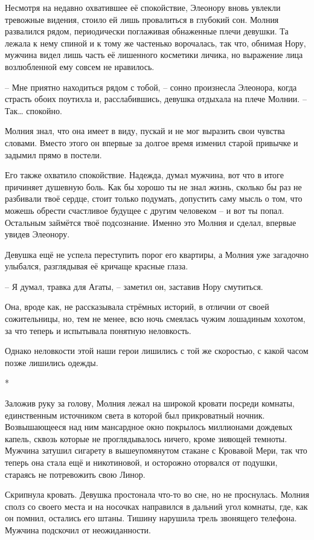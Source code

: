 \documentclass[
  a5paperpaper,
  DIV=11,
  numbers=noendperiod]{scrreprt}
\begin{document}

Несмотря на недавно охватившее её спокойствие, Элеонору вновь увлекли
тревожные видения, стоило ей лишь провалиться в глубокий сон. Молния
развалился рядом, периодически поглаживая обнаженные плечи девушки. Та
лежала к нему спиной и к тому же частенько ворочалась, так что, обнимая
Нору, мужчина видел лишь часть её лишенного косметики личика, но
выражение лица возлюбленной ему совсем не нравилось.

-- Мне приятно находиться рядом с тобой, -- сонно произнесла Элеонора,
когда страсть обоих поутихла и, расслабившись, девушка отдыхала на плече
Молнии. -- Так\ldots{} спокойно.

Молния знал, что она имеет в виду, пускай и не мог выразить свои чувства
словами. Вместо этого он впервые за долгое время изменил старой привычке
и задымил прямо в постели.

Его также охватило спокойствие. Надежда, думал мужчина, вот что в итоге
причиняет душевную боль. Как бы хорошо ты не знал жизнь, сколько бы раз
не разбивали твоё сердце, стоит только подумать, допустить саму мысль о
том, что можешь обрести счастливое будущее с другим человеком -- и вот
ты попал. Остальным займётся твоё подсознание. Именно это Молния и
сделал, впервые увидев Элеонору.

Девушка ещё не успела переступить порог его квартиры, а Молния уже
загадочно улыбался, разглядывая её кричаще красные глаза.

-- Я думал, травка для Агаты, -- заметил он, заставив Нору смутиться.

Она, вроде как, не рассказывала стрёмных историй, в отличии от своей
сожительницы, но, тем не менее, всю ночь смеялась чужим лошадиным
хохотом, за что теперь и испытывала понятную неловкость.

Однако неловкости этой наши герои лишились с той же скоростью, с какой
часом позже лишились одежды.

*

Заложив руку за голову, Молния лежал на широкой кровати посреди комнаты,
единственным источником света в которой был прикроватный ночник.
Возвышающееся над ним мансардное окно покрылось миллионами дождевых
капель, сквозь которые не проглядывалось ничего, кроме зияющей темноты.
Мужчина затушил сигарету в вышеупомянутом стакане с Кровавой Мери, так
что теперь она стала ещё и никотиновой, и осторожно оторвался от
подушки, стараясь не потревожить свою Линор.

Скрипнула кровать. Девушка простонала что-то во сне, но не проснулась.
Молния сполз со своего места и на носочках направился в дальний угол
комнаты, где, как он помнил, остались его штаны. Тишину нарушила трель
звонящего телефона. Мужчина подскочил от неожиданности.
\end{document}
